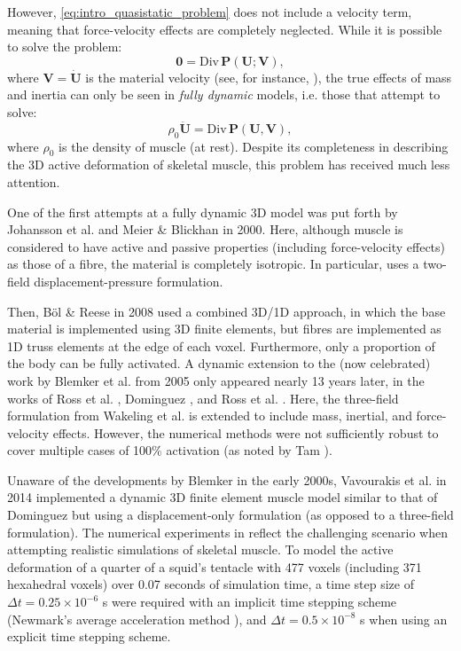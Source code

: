 \documentclass{sfuthesis}
\numberwithin{equation}{section}
\numberwithin{figure}{chapter}
\numberwithin{table}{chapter}
\theoremstyle{definition}
\def\*#1{{\mathbf{#1}}} %
\newcommand{\Divt}[1]{{\bm{\mathrm{Div}} \, #1}}
\begin{document}
However, \eqref{eq:intro_quasistatic_problem} does not include a velocity term, meaning that force-velocity effects are completely neglected. While it is possible to solve the problem:
\begin{equation}
    \*0 = \Divt{\*P(\*U; \*V)},
\end{equation}
where $\*V = \dot{\*U}$ is the material velocity (see, for instance, \cite{DiSalvoBlemker2024,HeidlaufRohrle2013,HeidlaufRohrle2014,MarcucciEtAl2017,Tang2009}), the true effects of mass and inertia can only be seen in \textit{fully dynamic} models, i.e. those that attempt to solve:
\begin{equation}
    \rho_0 \ddot{\*U} = \Divt{\*P(\*U, \*V)},
\end{equation}
where $\rho_0$ is the density of muscle (at rest). Despite its completeness in describing the 3D active deformation of skeletal muscle, this problem has received much less attention.

One of the first attempts at a fully dynamic 3D model was put forth by Johansson et al. \cite{Johansson2000} and Meier \& Blickhan \cite{MeierBlickhan2000} in 2000. Here, although muscle is considered to have active and passive properties (including force-velocity effects) as those of a fibre, the material is completely isotropic. In particular, \cite{Johansson2000} uses a two-field displacement-pressure formulation.


Then, B\"{o}l \& Reese \cite{BolReese2008} in 2008 used a combined 3D/1D approach, in which the base material is implemented using 3D finite elements, but fibres are implemented as 1D truss elements at the edge of each voxel. Furthermore, only a proportion of the body can be fully activated. A dynamic extension to the (now celebrated) work by Blemker et al. \cite{BlemkerPinskyDelp2005} from 2005 only appeared nearly 13 years later, in the works of Ross et al. \cite{Ross2018}, Dominguez \cite{Seba}, and Ross et al. \cite{Paper3_RossEtAl2021}. Here, the three-field formulation from Wakeling et al. \cite{Paper1_WakelingEtAl2020} is extended to include mass, inertial, and force-velocity effects. However, the numerical methods were not sufficiently robust to cover multiple cases of 100\% activation (as noted by Tam \cite{Cassidy}). 

Unaware of the developments by Blemker in the early 2000s, Vavourakis et al. \cite{Vavourakis2014} in 2014 implemented a dynamic 3D finite element muscle model similar to that of Dominguez \cite{Seba} but using a displacement-only formulation (as opposed to a three-field formulation). The numerical experiments in \cite{Vavourakis2014} reflect the challenging scenario when attempting realistic simulations of skeletal muscle. To model the active deformation of a quarter of a squid's tentacle with 477 voxels (including 371 hexahedral voxels) over 0.07 seconds of simulation time, a time step size of $\Delta t = 0.25 \times 10^{-6}$ s were required with an implicit time stepping scheme (Newmark's average acceleration method \cite{HughesBook}), and $\Delta t = 0.5 \times 10^{-8}$ s when using an explicit time stepping scheme.
\end{document}
